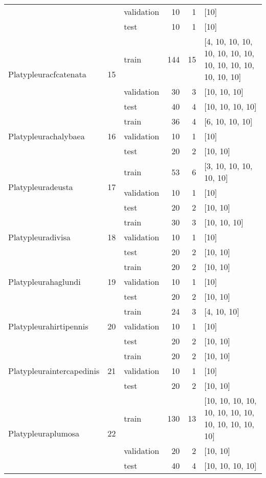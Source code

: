 \begin{longtable}{lrlrrl}
 &  & validation & 10 & 1 & [10] \\
 &  & test & 10 & 1 & [10] \\
\midrule
\multirow{3}{*}{Platypleuracfcatenata} & \multirow{3}{*}{15} & train & 144 & 15 & [4, 10, 10, 10, 10, 10, 10, 10, 10, 10, 10, 10, 10, 10, 10] \\
 &  & validation & 30 & 3 & [10, 10, 10] \\
 &  & test & 40 & 4 & [10, 10, 10, 10] \\
\midrule
\multirow{3}{*}{Platypleurachalybaea} & \multirow{3}{*}{16} & train & 36 & 4 & [6, 10, 10, 10] \\
 &  & validation & 10 & 1 & [10] \\
 &  & test & 20 & 2 & [10, 10] \\
\midrule
\multirow{3}{*}{Platypleuradeusta} & \multirow{3}{*}{17} & train & 53 & 6 & [3, 10, 10, 10, 10, 10] \\
 &  & validation & 10 & 1 & [10] \\
 &  & test & 20 & 2 & [10, 10] \\
\midrule
\multirow{3}{*}{Platypleuradivisa} & \multirow{3}{*}{18} & train & 30 & 3 & [10, 10, 10] \\
 &  & validation & 10 & 1 & [10] \\
 &  & test & 20 & 2 & [10, 10] \\
\midrule
\multirow{3}{*}{Platypleurahaglundi} & \multirow{3}{*}{19} & train & 20 & 2 & [10, 10] \\
 &  & validation & 10 & 1 & [10] \\
 &  & test & 20 & 2 & [10, 10] \\
\midrule
\multirow{3}{*}{Platypleurahirtipennis} & \multirow{3}{*}{20} & train & 24 & 3 & [4, 10, 10] \\
 &  & validation & 10 & 1 & [10] \\
 &  & test & 20 & 2 & [10, 10] \\
\midrule
\multirow{3}{*}{Platypleuraintercapedinis} & \multirow{3}{*}{21} & train & 20 & 2 & [10, 10] \\
 &  & validation & 10 & 1 & [10] \\
 &  & test & 20 & 2 & [10, 10] \\
\midrule
\multirow{3}{*}{Platypleuraplumosa} & \multirow{3}{*}{22} & train & 130 & 13 & [10, 10, 10, 10, 10, 10, 10, 10, 10, 10, 10, 10, 10] \\
 &  & validation & 20 & 2 & [10, 10] \\
 &  & test & 40 & 4 & [10, 10, 10, 10] \\

\end{longtable}
